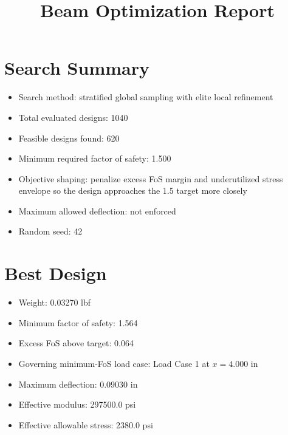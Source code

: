 \documentclass[11pt]{article}
\title{Beam Optimization Report}
\date{}
\begin{document}
\maketitle

\section*{Search Summary}
\begin{itemize}
\item Search method: stratified global sampling with elite local refinement
\item Total evaluated designs: 1040
\item Feasible designs found: 620
\item Minimum required factor of safety: 1.500
\item Objective shaping: penalize excess FoS margin and underutilized stress envelope so the design approaches the 1.5 target more closely
\item Maximum allowed deflection: not enforced
\item Random seed: 42
\end{itemize}

\section*{Best Design}
\begin{itemize}
\item Weight: 0.03270 lbf
\item Minimum factor of safety: 1.564
\item Excess FoS above target: 0.064
\item Governing minimum-FoS load case: Load Case 1 at $x=4.000$ in
\item Maximum deflection: 0.09030 in
\item Effective modulus: 297500.0 psi
\item Effective allowable stress: 2380.0 psi
\end{itemize}
\end{document}
